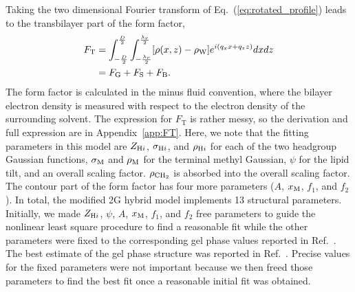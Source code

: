 Taking the two dimensional Fourier transform of Eq.~(\ref{eq:rotated_profile})
leads to the transbilayer part of the form factor,
\begin{align}
  F_\mathrm{T} 
  &= \int_{-\frac{D}{2}}^{\frac{D}{2}} \int_{-\frac{\lambda_r}{2}}^{\frac{\lambda_r}{2}} 
     \mathopen{}\left[ \rho(x,z)-\rho_\mathrm{W} \right]\mathclose{} e^{i(q_xx+q_zz)} dxdz \\
  &= F_\mathrm{G} + F_\mathrm{S} + F_\mathrm{B}.
\end{align}
The form factor is calculated in the minus fluid convention, 
where the bilayer electron density
is measured with respect to the electron density of the surrounding solvent.
The expression for $F_\mathrm{T}$ is rather messy, so 
the derivation and full expression are in Appendix~\ref{app:FT}. Here, 
we note that
the fitting parameters in this model are $Z_{\mathrm{H}i}$, $\sigma_{\mathrm{H}i}$, and 
$\rho_{\mathrm{H}i}$ for each of the two headgroup Gaussian functions, $\sigma_\mathrm{M}$ and
$\rho_\mathrm{M}$ for
the terminal methyl Gaussian, $\psi$ for
the lipid tilt, and an overall scaling factor. $\rho_\mathrm{CH_2}$ is absorbed into 
the overall scaling factor. The contour part of the 
form factor has four more parameters ($A$, $x_\textrm{M}$, $f_1$, and $f_2$).
In total, the modified 2G hybrid model implements 13 structural parameters.
Initially, we made $Z_{\mathrm{H}i}$, $\psi$, $A$, $x_\textrm{M}$, $f_1$, and $f_2$ free 
parameters
to guide the nonlinear least square procedure to find a reasonable fit
while the other parameters were fixed to the corresponding gel phase values 
reported in Ref.~\cite{ref:Wiener89}. 
The best estimate of the gel phase structure was reported in
Ref.~\cite{Tristram-Nagle02}. Precise values for the fixed parameters
were not important because we then freed those parameters to find the best fit
once a reasonable initial fit was obtained.  

